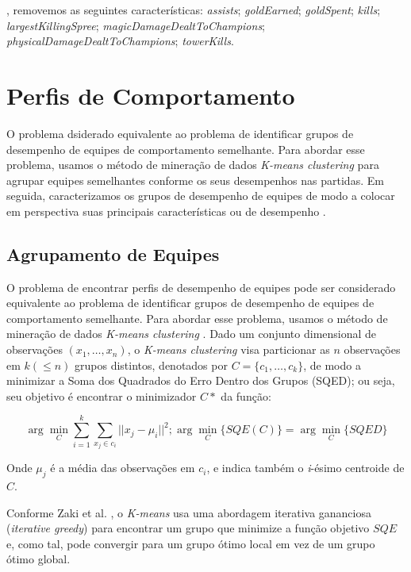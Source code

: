 , removemos as seguintes características: \textit{assists}; \textit{goldEarned}; \textit{goldSpent}; \textit{kills}; \textit{largestKillingSpree}; \textit{magicDamageDealtToChampions}; \textit{physicalDamageDealtToChampions}; \textit{towerKills}.

\chapter{Perfis de Comportamento} \label{cap:perfiscomportamento}

O problema dsiderado equivalente ao problema de identificar grupos de desempenho de equipes de comportamento semelhante. Para abordar esse problema, usamos o método de mineração de dados \textit{K-means clustering} \cite{zaki2014data} para agrupar equipes semelhantes conforme os seus desempenhos nas partidas. Em seguida, caracterizamos  os grupos de desempenho de equipes de modo a colocar em perspectiva suas principais características ou  de desempenho .

\section{Agrupamento de Equipes} \label{agrupamentoequipes}
O problema de encontrar perfis de desempenho de equipes pode ser considerado equivalente ao problema de identificar grupos de desempenho de equipes de comportamento semelhante. Para abordar esse problema, usamos o método de mineração de dados \textit{K-means clustering} \cite{zaki2014data}. Dado um conjunto dimensional de observações $(x_{1}, \ldots, x_{n} )$, o \textit{K-means clustering} visa particionar as $n$ observações em $k (\leq n)$ grupos distintos, denotados por $ C = \{c_1, \ldots , c_k \} $, de modo a minimizar a Soma dos Quadrados do Erro Dentro dos Grupos (SQED); ou seja, seu objetivo é encontrar o minimizador $C*$ da função:

\begin{displaymath}
  \arg\min_{C} \sum_{i=1}^{k} \sum_{x_j \in c_i}{} || x_j - \mu _i ||^2; \arg\min_{C} \{SQE(C)\} = \arg\min_{C} \{SQED\}
\end{displaymath}

Onde $\mu_j$ é a média das observações em $c_i$, e indica também o \textit{i}-ésimo centroide de $C$.

Conforme Zaki et al. \cite{zaki2014data}, o \textit{K-means} usa uma abordagem iterativa gananciosa (\textit{iterative greedy}) para encontrar um grupo que minimize a função objetivo $SQE$ e, como tal, pode convergir para um grupo ótimo local em vez de um grupo ótimo global.

